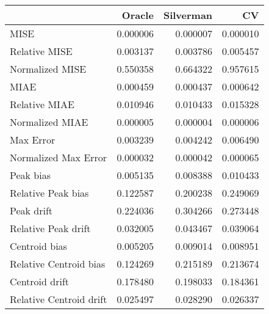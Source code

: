 \begin{tabular}{lrrr}
  \hline
 & Oracle & Silverman & CV \\ 
  \hline
MISE & 0.000006 & 0.000007 & 0.000010 \\ 
  Relative MISE & 0.003137 & 0.003786 & 0.005457 \\ 
  Normalized MISE & 0.550358 & 0.664322 & 0.957615 \\ 
  MIAE & 0.000459 & 0.000437 & 0.000642 \\ 
  Relative MIAE & 0.010946 & 0.010433 & 0.015328 \\ 
  Normalized MIAE & 0.000005 & 0.000004 & 0.000006 \\ 
  Max Error & 0.003239 & 0.004242 & 0.006490 \\ 
  Normalized Max Error & 0.000032 & 0.000042 & 0.000065 \\ 
  Peak bias & 0.005135 & 0.008388 & 0.010433 \\ 
  Relative Peak bias & 0.122587 & 0.200238 & 0.249069 \\ 
  Peak drift & 0.224036 & 0.304266 & 0.273448 \\ 
  Relative Peak drift & 0.032005 & 0.043467 & 0.039064 \\ 
  Centroid bias & 0.005205 & 0.009014 & 0.008951 \\ 
  Relative Centroid bias & 0.124269 & 0.215189 & 0.213674 \\ 
  Centroid drift & 0.178480 & 0.198033 & 0.184361 \\ 
  Relative Centroid drift & 0.025497 & 0.028290 & 0.026337 \\ 
   \hline
\end{tabular}
